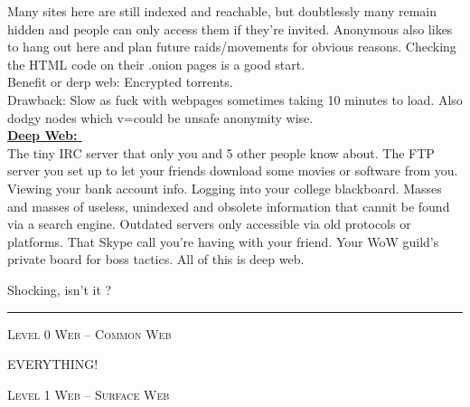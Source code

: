 \documentclass[11pt,twoside,a4paper]{book}
\begin{document}
\noindent
Many sites here are still indexed and reachable, but doubtlessly many remain hidden and people can only access them if they're invited. Anonymous also likes to hang out here and plan future raids/movements for obvious reasons. Checking the HTML code on their .onion pages is a good start.~\\ 

\noindent
Benefit or derp web: Encrypted torrents.~\\
Drawback: Slow as fuck with webpages sometimes taking 10 minutes to load. Also dodgy nodes which v=could be unsafe anonymity wise.~\\

\noindent
\textbf{\underline{Deep Web: }}~\\

\noindent
The tiny IRC server that only you and 5 other people know about. The FTP server you set up to let your friends download some movies or software from you. Viewing your bank account info. Logging into your college blackboard. Masses and masses of useless, unindexed and obsolete information that cannit be found via a search engine. Outdated servers only accessible via old protocols or platforms. That Skype call you're having with your friend. Your WoW guild's private board for boss tactics. All of this is deep web.

\noindent
Shocking, isn't it ?

\begin{center} \rule{0.85\textwidth}{1mm} \end{center}

\clearpage

\noindent
\textsc{Level 0 Web -- Common Web}	\begin{huge} EVERYTHING! \end{huge}

\noindent
\textsc{Level 1 Web -- Surface Web}
\end{document}
